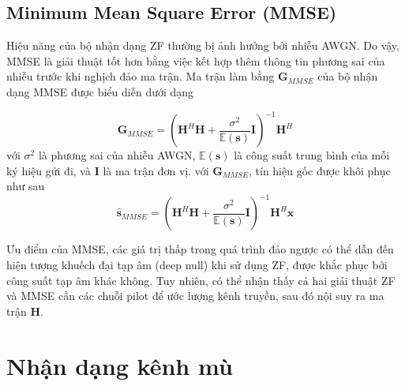 \subsection{Minimum Mean Square Error (MMSE)} \label{sec:mmse}

Hiệu năng của bộ nhận dạng ZF thường bị ảnh hưởng bởi nhiễu AWGN. Do vậy, MMSE là giải thuật tốt hơn bằng việc kết hợp thêm thông tin phương sai của nhiễu trước khi nghịch đảo ma trận. Ma trận làm bằng $\mathbf{G}_{MMSE}$ của bộ nhận dạng MMSE được biểu diễn dưới dạng

\begin{equation}
    \mathbf{G}_{MMSE}=\left(\mathbf{H}^H \mathbf{H}+\frac{\sigma^2}{\mathbb{E}(\mathbf{s})} \mathbf{I}\right)^{-1} \mathbf{H}^H
\end{equation}
với $\sigma^2$ là phương sai của nhiễu AWGN, $\mathbb{E}(\mathbf{s})$ là công suất trung bình của mỗi ký hiệu gửi đi, và $\mathbf{I}$ là ma trận đơn vị. với $\mathbf{G}_{MMSE}$, tín hiệu gốc được khôi phục như sau
\begin{equation}
    \hat{\mathbf{s}}_{MMSE}=\left(\mathbf{H}^H \mathbf{H}+\frac{\sigma^2}{\mathbb{E}(\mathbf{s})} \mathbf{I}\right)^{-1} \mathbf{H}^H \mathbf{x}
\end{equation}

Ưu điểm của MMSE, các giá trị thấp trong quá trình đảo ngược có thể dẫn đến hiện tượng khuếch đại tạp âm (deep null) khi sử dụng ZF, được khắc phục bởi công suất tạp âm khác không. Tuy nhiên, có thể nhận thấy cả hai giải thuật ZF và MMSE cần các chuỗi pilot để ước lượng kênh truyền, sau đó nội suy ra ma trận $\mathbf{H}$.

\section{Nhận dạng kênh mù} \label{sec:blind}

